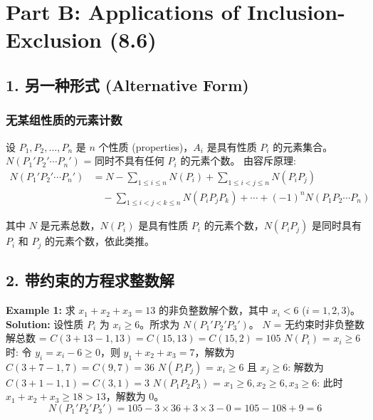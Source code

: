 \documentclass[10pt,a4paper,openany]{ctexbook}
\theoremstyle{definition}
\theoremstyle{remark}
\begin{document}
\vspace{-2pt}

\section{Part B: Applications of Inclusion-Exclusion (8.6)}

\subsection{1. 另一种形式 (Alternative Form)}

\subsubsection{无某组性质的元素计数}

设 $P_1, P_2, \dots, P_n$ 是 $n$ 个性质 (properties)，$A_i$ 是具有性质 $P_i$ 的元素集合。
$N(P_1' P_2' \cdots P_n')$ = 同时不具有任何 $P_i$ 的元素个数。
由容斥原理:
\[
\begin{aligned}
N(P_1' P_2' \cdots P_n') &= N - \sum_{1 \le i \le n} N(P_i) + \sum_{1 \le i < j \le n} N(P_i P_j) \\
&\quad - \sum_{1 \le i < j < k \le n} N(P_i P_j P_k) + \cdots + (-1)^n N(P_1 P_2 \cdots P_n)
\end{aligned}
\]

其中 $N$ 是元素总数，$N(P_i)$ 是具有性质 $P_i$ 的元素个数，$N(P_i P_j)$ 是同时具有 $P_i$ 和 $P_j$ 的元素个数，依此类推。
\vspace{-2pt}

\subsection{2. 带约束的方程求整数解}

\textbf{Example 1:} 求 $x_1 + x_2 + x_3 = 13$ 的非负整数解个数，其中 $x_i < 6$ ($i = 1,2,3$)。
\textbf{Solution:}
设性质 $P_i$ 为 $x_i \ge 6$。所求为 $N(P_1' P_2' P_3')$。
$N$ = 无约束时非负整数解总数 = $C(3+13-1, 13) = C(15,13) = C(15,2) = 105$
$N(P_i)$ = $x_i \ge 6$ 时: 令 $y_i = x_i - 6 \ge 0$，则 $y_1 + x_2 + x_3 = 7$，解数为 $C(3+7-1,7) = C(9,7) = 36$
$N(P_i P_j)$ = $x_i \ge 6$ 且 $x_j \ge 6$: 解数为 $C(3+1-1,1) = C(3,1) = 3$
$N(P_1 P_2 P_3)$ = $x_1 \ge 6, x_2 \ge 6, x_3 \ge 6$: 此时 $x_1 + x_2 + x_3 \ge 18 > 13$，解数为 0。
\[
N(P_1' P_2' P_3') = 105 - 3 \times 36 + 3 \times 3 - 0 = 105 - 108 + 9 = 6
\]

\vspace{-2pt}
\end{document}
